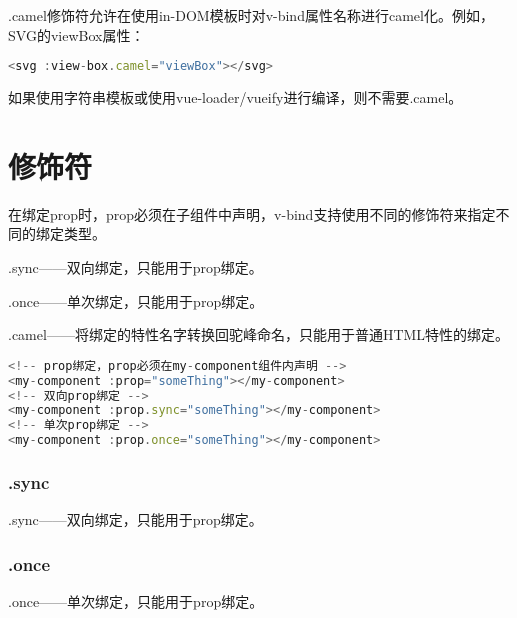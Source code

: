 \begin{compactitem}
\item .camel修饰符允许在使用in-DOM模板时对v-bind属性名称进行camel化。例如，SVG的viewBox属性：

\begin{lstlisting}[language=JavaScript]
<svg :view-box.camel="viewBox"></svg>
\end{lstlisting}


\item 如果使用字符串模板或使用vue-loader/vueify进行编译，则不需要.camel。
\end{compactitem}


\section{修饰符}

在绑定prop时，prop必须在子组件中声明，v-bind支持使用不同的修饰符来指定不同的绑定类型。


\begin{compactitem}
\item .sync——双向绑定，只能用于prop绑定。
\item .once——单次绑定，只能用于prop绑定。
\item .camel——将绑定的特性名字转换回驼峰命名，只能用于普通HTML特性的绑定。
\end{compactitem}


\begin{lstlisting}[language=JavaScript]
<!-- prop绑定，prop必须在my-component组件内声明 -->
<my-component :prop="someThing"></my-component>
<!-- 双向prop绑定 -->
<my-component :prop.sync="someThing"></my-component>
<!-- 单次prop绑定 -->
<my-component :prop.once="someThing"></my-component>
\end{lstlisting}


\subsubsection{.sync}

.sync——双向绑定，只能用于prop绑定。



\subsubsection{.once}

.once——单次绑定，只能用于prop绑定。


\begin{lstlisting}[language=JavaScript]

\end{lstlisting}


